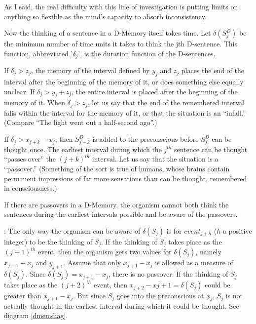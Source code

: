 As I said, the real difficulty with this line of investigation is putting 
limits on anything so flexible as the mind's capacity to absorb inconsistency. 

Now the thinking of a sentence in a D-Memory itself takes time. Let 
$\delta(S^D_j)$ be the minimum number of time units it takes to think the jth 
D-sentence. This function, abbreviated '$\delta_j$', is the duration function of the 
D-sentences. 

\begin{hangers}
 If $\delta_j\greater z_j$, the memory of the interval defined by $y_j$ and 
$z_j$ places the end of the interval after the beginning of the memory of it, or 
does something else equally unclear. If $\delta_j\greater y_j+z_j$, the entire interval is placed 
after the beginning of the memory of it. When $\delta_j\greater z_j$, let us say that the end 
of the remembered interval falis within the interval for the memory of it, or 
that the situation is an \enquote{infall.} (Compare \enquote{The light went out a half-second 
ago}.)

 If $\delta_j\greater x_{j+k}-x_j$, then $S^D_{j+k}$ is added to the preconscious 
	before $S^D_j$ can be thought once. The earliest interval during which the $j^{th}$ 
	sentence can be thought \enquote{passes over} the $(j+k)^{th}$ interval. Let us say that 
the situation is a \enquote{passover.} (Something of the sort is true of humans, 
whose brains contain permanent impressions of far more sensations than can 
be thought, remembered in consciousness.) 

 If there are passovers in a D-Memory, the organism 
cannot both think the sentences during the earliest intervals possible and be 
aware of the passovers. 

\proof: The only way the organism can be aware of $\delta(S_j)$
is for $event_{j+h}$ ($h$ a positive integer) to be the thinking of $S_j$. 
If the thinking of $S_j$ takes piace as the $(j+1)^{th}$ event, then the organism gets two 
values for $\delta(S_j)$, namely $x_{j+1}-x_j$ and $y_{j+1}$. Assume that only $x_{j+1}-x_j$
is allowed as a measure of $\delta(S_j)$. Since $\delta(S_j)=x_{j+1}-x_j$, there is no passover. If 
the thinking of $S_j$ takes place as the $(j+2)^{th}$ event, then $x_{j+2}-x{j+1}=\delta(S_j)$
could be greater than $x_{j+1}-x_j$. But since $S_j$ goes into the preconscious at $x_j$, 
$S_j$ is not actually thought in the earliest interval during which it could be 
thought. See diagram \ref{dmemdiag}.


\end{hangers}
